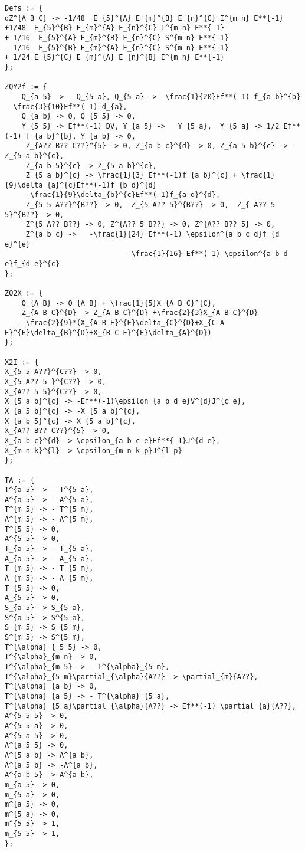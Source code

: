 \documentclass[11pt]{article}
\begin{document}
{\begin{verbatim}
Defs := {
dZ^{A B C} -> -1/48  E_{5}^{A} E_{m}^{B} E_{n}^{C} I^{m n} E**{-1} 
+1/48  E_{5}^{B} E_{m}^{A} E_{n}^{C} I^{m n} E**{-1} 
+ 1/16  E_{5}^{A} E_{m}^{B} E_{n}^{C} S^{m n} E**{-1} 
- 1/16  E_{5}^{B} E_{m}^{A} E_{n}^{C} S^{m n} E**{-1}
+ 1/24 E_{5}^{C} E_{m}^{A} E_{n}^{B} I^{m n} E**{-1}
};

ZQY2f := {
    Q_{a 5} -> - Q_{5 a}, Q_{5 a} -> -\frac{1}{20}Ef**(-1) f_{a b}^{b} - \frac{3}{10}Ef**(-1) d_{a},
    Q_{a b} -> 0, Q_{5 5} -> 0,
    Y_{5 5} -> Ef**(-1) DV, Y_{a 5} ->   Y_{5 a},  Y_{5 a} -> 1/2 Ef**(-1) f_{a b}^{b}, Y_{a b} -> 0,
     Z_{A?? B?? C??}^{5} -> 0, Z_{a b c}^{d} -> 0, Z_{a 5 b}^{c} -> - Z_{5 a b}^{c},
     Z_{a b 5}^{c} -> Z_{5 a b}^{c}, 
     Z_{5 a b}^{c} -> \frac{1}{3} Ef**(-1)f_{a b}^{c} + \frac{1}{9}\delta_{a}^{c}Ef**(-1)f_{b d}^{d}
     -\frac{1}{9}\delta_{b}^{c}Ef**(-1)f_{a d}^{d},
     Z_{5 5 A??}^{B??} -> 0,  Z_{5 A?? 5}^{B??} -> 0,  Z_{ A?? 5 5}^{B??} -> 0,  
     Z^{5 A?? B??} -> 0, Z^{A?? 5 B??} -> 0, Z^{A?? B?? 5} -> 0,
     Z^{a b c} ->   -\frac{1}{24} Ef**(-1) \epsilon^{a b c d}f_{d e}^{e}
                             -\frac{1}{16} Ef**(-1) \epsilon^{a b d e}f_{d e}^{c}
};

ZQ2X := {
    Q_{A B} -> Q_{A B} + \frac{1}{5}X_{A B C}^{C},
    Z_{A B C}^{D} -> Z_{A B C}^{D} +\frac{2}{3}X_{A B C}^{D} 
   - \frac{2}{9}*(X_{A B E}^{E}\delta_{C}^{D}+X_{C A E}^{E}\delta_{B}^{D}+X_{B C E}^{E}\delta_{A}^{D})
};

X2I := {
X_{5 5 A??}^{C??} -> 0,
X_{5 A?? 5 }^{C??} -> 0,
X_{A?? 5 5}^{C??} -> 0,
X_{5 a b}^{c} -> -Ef**(-1)\epsilon_{a b d e}V^{d}J^{c e},
X_{a 5 b}^{c} -> -X_{5 a b}^{c},
X_{a b 5}^{c} -> X_{5 a b}^{c},
X_{A?? B?? C??}^{5} -> 0,
X_{a b c}^{d} -> \epsilon_{a b c e}Ef**{-1}J^{d e},
X_{m n k}^{l} -> \epsilon_{m n k p}J^{l p}
};

TA := {
T^{a 5} -> - T^{5 a},
A^{a 5} -> - A^{5 a},
T^{m 5} -> - T^{5 m},
A^{m 5} -> - A^{5 m},
T^{5 5} -> 0,
A^{5 5} -> 0,
T_{a 5} -> - T_{5 a},
A_{a 5} -> - A_{5 a},
T_{m 5} -> - T_{5 m},
A_{m 5} -> - A_{5 m},
T_{5 5} -> 0,
A_{5 5} -> 0,
S_{a 5} -> S_{5 a},
S^{a 5} -> S^{5 a},
S_{m 5} -> S_{5 m},
S^{m 5} -> S^{5 m},
T^{\alpha}_{ 5 5} -> 0,
T^{\alpha}_{m n} -> 0,
T^{\alpha}_{m 5} -> - T^{\alpha}_{5 m},
T^{\alpha}_{5 m}\partial_{\alpha}{A??} -> \partial_{m}{A??},
T^{\alpha}_{a b} -> 0,
T^{\alpha}_{a 5} -> - T^{\alpha}_{5 a},
T^{\alpha}_{5 a}\partial_{\alpha}{A??} -> Ef**(-1) \partial_{a}{A??},
A^{5 5 5} -> 0,
A^{5 5 a} -> 0,
A^{5 a 5} -> 0,
A^{a 5 5} -> 0,
A^{5 a b} -> A^{a b},
A^{a 5 b} -> -A^{a b},
A^{a b 5} -> A^{a b},
m_{a 5} -> 0,
m_{5 a} -> 0,
m^{a 5} -> 0,
m^{5 a} -> 0,
m^{5 5} -> 1,
m_{5 5} -> 1,
};



\end{verbatim}}
\end{document}
